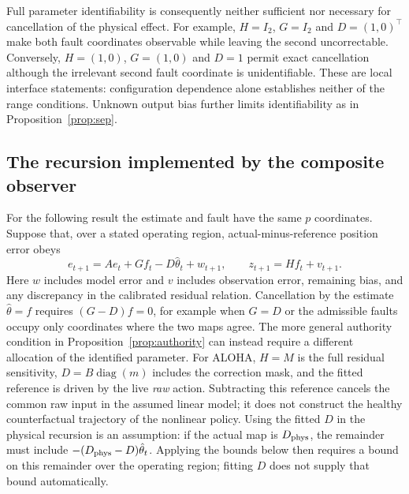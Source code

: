 Full parameter identifiability is consequently neither sufficient nor necessary
for cancellation of the physical effect. For example, $H=I_2$, $G=I_2$ and
$D=(1,0)^\top$ make both fault coordinates observable while leaving the second
uncorrectable. Conversely, $H=(1,0)$, $G=(1,0)$ and $D=1$ permit exact cancellation
although the irrelevant second fault coordinate is unidentifiable. These are
local interface statements: configuration dependence alone establishes neither
of the range conditions. Unknown output bias further limits identifiability as
in Proposition~\ref{prop:sep}.

\subsection{The recursion implemented by the composite observer}

For the following result the estimate and fault have the same $p$ coordinates.
Suppose that, over a stated operating region, actual-minus-reference position
error obeys
\begin{equation}\label{eq:local-position-error}
e_{t+1}=Ae_t+Gf_t-D\hat\theta_t+w_{t+1},\qquad
z_{t+1}=Hf_t+v_{t+1}.
\end{equation}
Here $w$ includes model error and $v$ includes observation error, remaining bias,
and any discrepancy in the calibrated residual relation. Cancellation by the
estimate $\hat\theta=f$ requires $(G-D)f=0$, for example when $G=D$ or the
admissible faults occupy only coordinates where the two maps agree. The more
general authority condition in Proposition~\ref{prop:authority} can instead
require a different allocation of the identified parameter. For ALOHA,
$H=M$ is the full residual sensitivity,
$D=B\operatorname{diag}(m)$ includes the correction mask, and the fitted reference
is driven by the live \emph{raw} action. Subtracting this reference cancels the
common raw input in the assumed linear model; it does not construct the healthy
counterfactual trajectory of the nonlinear policy.
Using the fitted $D$ in the physical recursion is an assumption: if the actual
map is $D_{\rm phys}$, the remainder must include
$-(D_{\rm phys}-D)\hat\theta_t$. Applying the bounds below then requires a
bound on this remainder over the operating region; fitting $D$ does not supply
that bound automatically.

